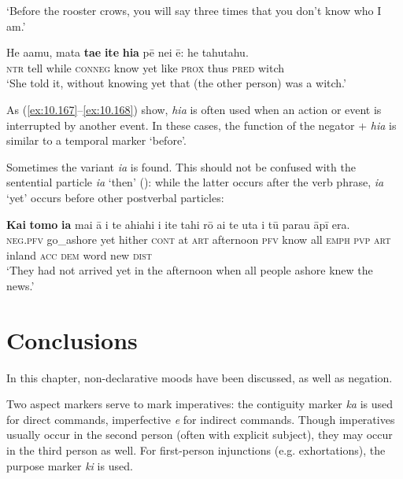 \glt 
‘Before the rooster crows, you will say three times that you don’t know who I am.’ \textstyleExampleref{[Jhn. 13:38]}
\z

\ea\label{ex:10.169}
\gll He {\ꞌ}a{\ꞌ}amu, mata \textbf{ta{\ꞌ}e} \textbf{{\ꞌ}ite} \textbf{hia} pē nei ē: he tahutahu. \\
\textsc{ntr} tell while \textsc{conneg} know yet like \textsc{prox} thus \textsc{pred} witch \\

\glt
‘She told it, without knowing yet that (the other person) was a witch.’ \textstyleExampleref{[R532-07.044]}
\z

As (\ref{ex:10.167}–\ref{ex:10.168}) show, \textit{hia} is often used when an action or event is interrupted by another event. In these cases, the function of the negator + \textit{hia} is similar to a temporal marker ‘before’.

Sometimes the variant \textit{ia} is found. This should not be confused with the sentential particle \textit{ia} ‘then’ (): while the latter occurs after the verb phrase, \textit{ia} ‘yet’ occurs before other postverbal particles:

\ea\label{ex:10.170}
\gll \textbf{Kai} \textbf{tomo} \textbf{ia} mai {\ꞌ}ā {\ꞌ}i te ahiahi i {\ꞌ}ite tahi rō ai te {\ꞌ}uta i tū parau {\ꞌ}āpī era.\\
\textsc{neg.pfv} go\_ashore yet hither \textsc{cont}\textsc{} at \textsc{art} afternoon \textsc{pfv} know all \textsc{emph} \textsc{pvp} \textsc{art} inland \textsc{acc} \textsc{dem} word new \textsc{dist}\\

\glt 
‘They had not arrived yet in the afternoon when all people ashore knew the news.’ \textstyleExampleref{[R345.015]}\textstyleExampleref{} 
\z
{}

\newpage 
\section{Conclusions}\label{sec:10.6}

In this chapter, non-declarative moods have been discussed, as well as negation.

Two aspect markers serve to mark imperatives: the contiguity marker \textit{ka} is used for direct commands, imperfective \textit{e} for indirect commands. Though imperatives usually occur in the second person (often with explicit subject), they may occur in the third person as well. For first-person injunctions (e.g. exhortations), the purpose marker \textit{ki} is used. 

